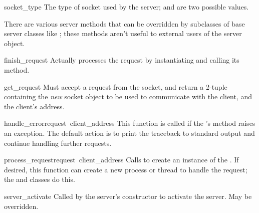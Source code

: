 \begin{datadesc}{socket_type}
The type of socket used by the server; 
and  are two possible values.
\end{datadesc}

There are various server methods that can be overridden by subclasses
of base server classes like ; these methods aren't
useful to external users of the server object.


\begin{funcdesc}{finish_request}{}
Actually processes the request by instantiating
 and calling its  method.
\end{funcdesc}

\begin{funcdesc}{get_request}{}
Must accept a request from the socket, and return a 2-tuple containing
the \emph{new} socket object to be used to communicate with the
client, and the client's address.
\end{funcdesc}

\begin{funcdesc}{handle_error}{request\, client_address}
This function is called if the 's
 method raises an exception.  The default action is
to print the traceback to standard output and continue handling
further requests.
\end{funcdesc}

\begin{funcdesc}{process_request}{request\, client_address}
Calls  to create an instance of the
.  If desired, this function can create a
new process or thread to handle the request; the 
and  classes do this.
\end{funcdesc}


\begin{funcdesc}{server_activate}{}
Called by the server's constructor to activate the server.
May be overridden.
\end{funcdesc}

